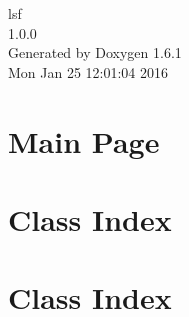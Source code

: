 \documentclass[a4paper]{book}
\begin{document}
\hypersetup{pageanchor=false}
\begin{titlepage}
\vspace*{7cm}
\begin{center}
{\Large lsf \\[1ex]\large 1.0.0 }\\
\vspace*{1cm}
{\large Generated by Doxygen 1.6.1}\\
\vspace*{0.5cm}
{\small Mon Jan 25 12:01:04 2016}\\
\end{center}
\end{titlepage}
\clearemptydoublepage
{}
\tableofcontents
\clearemptydoublepage
{}
\hypersetup{pageanchor=true}
\chapter{Main Page}
\label{index}\hypertarget{index}{}
\chapter{Class Index}

\chapter{Class Index}

\end{document}
